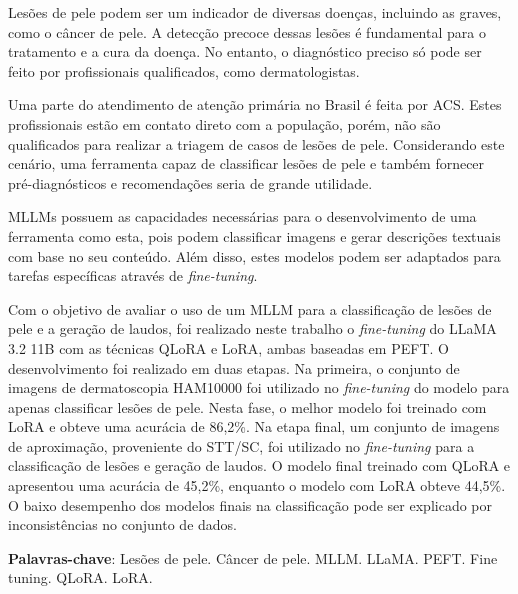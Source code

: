 \imprimircapa

\imprimirfolhaderosto*

\begin{fichacatalografica}
    
\end{fichacatalografica}





\setlength{\absparsep}{18pt}
\begin{resumo}
    \SingleSpacing
    Lesões de pele podem ser um indicador de diversas doenças, incluindo as graves, como o câncer de pele. A detecção
    precoce dessas lesões é fundamental para o tratamento e a cura da doença. No entanto, o diagnóstico preciso só pode
    ser feito por profissionais qualificados, como dermatologistas.

    Uma parte do atendimento de atenção primária no Brasil é feita por \ac{ACS}. Estes profissionais estão em contato
    direto com a população, porém, não são qualificados para realizar a triagem de casos de lesões de pele.
    Considerando este cenário, uma ferramenta capaz de classificar lesões de pele e também fornecer pré-diagnósticos e
    recomendações seria de grande utilidade.

    \acp{MLLM} possuem as capacidades necessárias para o desenvolvimento de uma ferramenta como esta, pois podem
    classificar imagens e gerar descrições textuais com base no seu conteúdo. Além disso, estes modelos podem ser
    adaptados para tarefas específicas através de \textit{fine-tuning}.

    Com o objetivo de avaliar o uso de um \ac{MLLM} para a classificação de lesões de pele e a geração de laudos, foi
    realizado neste trabalho o \textit{fine-tuning} do \ac{LLaMA} 3.2 11B com as técnicas \ac{QLoRA} e \ac{LoRA}, ambas
    baseadas em \ac{PEFT}. O desenvolvimento foi realizado em duas etapas. Na primeira, o conjunto de imagens de
    dermatoscopia \ac{HAM10000} foi utilizado no \textit{fine-tuning} do modelo para apenas classificar lesões de pele.
    Nesta fase, o melhor modelo foi treinado com \ac{LoRA} e obteve uma acurácia de 86,2\%. Na etapa final, um
    conjunto de imagens de aproximação, proveniente do \ac{STT/SC}, foi utilizado no \textit{fine-tuning} para a
    classificação de lesões e geração de laudos. O modelo final treinado com \ac{QLoRA} e apresentou uma acurácia de
    45,2\%, enquanto o modelo com \ac{LoRA} obteve 44,5\%. O baixo desempenho dos modelos finais na classificação pode
    ser explicado por inconsistências no conjunto de dados.

    \textbf{Palavras-chave}: Lesões de pele. Câncer de pele. MLLM. LLaMA. PEFT. Fine tuning. QLoRA. LoRA.
\end{resumo}

